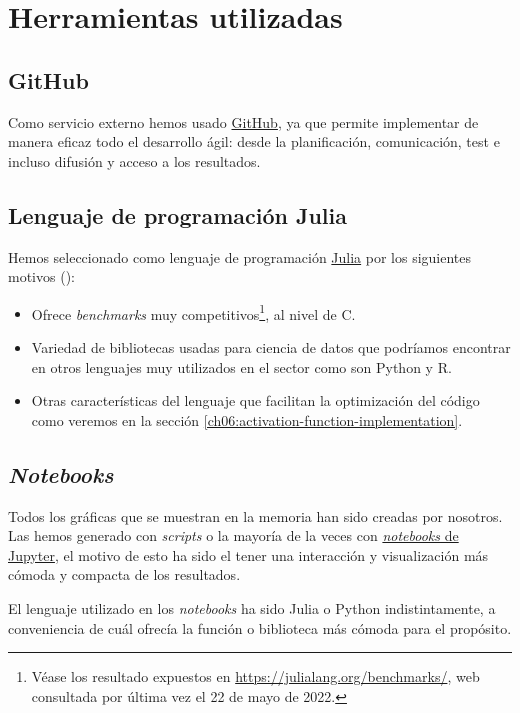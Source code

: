 
\section{Herramientas utilizadas}
\label{ch01:Herramientas}
\subsection{GitHub}
Como servicio externo hemos usado \href{https://github.com}{GitHub}, ya que permite implementar de manera eficaz
 todo el desarrollo ágil: 
desde la planificación, comunicación, test e incluso difusión y acceso a los resultados. 

\subsection{Lenguaje de programación Julia}
Hemos seleccionado como lenguaje de programación \href{https://julialang.org}{Julia} 
por los siguientes motivos (\cite{virtudes-de-julia}): 
\begin{itemize}
    \item Ofrece \textit{benchmarks} 
    muy competitivos\footnote{Véase los resultado expuestos en 
    \url{https://julialang.org/benchmarks/}, 
    web consultada por última vez el 22 de mayo de 2022.},
    al nivel de C.
    \item Variedad de bibliotecas usadas para ciencia de datos que podríamos encontrar 
    en otros lenguajes muy utilizados en el sector como son Python y R. 
    \item Otras características del lenguaje que facilitan 
    la optimización del código como veremos en la sección \ref{ch06:activation-function-implementation}. 
\end{itemize}

\subsection{\textit{Notebooks}}

Todos los gráficas que se muestran en la memoria han sido creadas por nosotros. 
Las hemos generado con \textit{scripts} o la mayoría de la veces con 
\href{https://jupyter.org}{\textit{notebooks} de Jupyter}, el motivo de esto ha 
sido el tener una interacción y visualización más cómoda y compacta de los resultados.

El lenguaje utilizado en los \textit{notebooks} ha sido Julia o Python indistintamente,
a conveniencia de cuál ofrecía la función o biblioteca más cómoda para el propósito.  


 